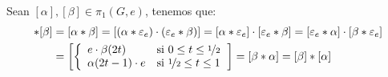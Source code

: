 \begin{ejercicio}
\begin{enumerate}[label=\alph*)]
            Sean $[\alpha],[\beta]\in \pi_1(G,e)$, tenemos que:
            \begin{align*}
                [\alpha]\ast[\beta] &= [\alpha\ast \beta] = [(\alpha\ast \varepsilon_e)\cdot (\varepsilon_e\ast \beta)] = [\alpha\ast \varepsilon_e] \cdot [\varepsilon_e\ast \beta]=  [\varepsilon_e\ast \alpha] \cdot [\beta\ast\varepsilon_e]  \\
                                    &= \left[ \left\{\begin{array}{ll}
                                         e\cdot \beta(2t)& \text{si\ } 0\leq t \leq \nicefrac{1}{2} \\
                                         \alpha(2t-1)\cdot e& \text{si\ } \nicefrac{1}{2}\leq t \leq 1
                             \end{array}\right.  \right] = [\beta\ast \alpha] = [\beta]\ast [\alpha]
            \end{align*}
    \end{enumerate}
\end{ejercicio}

